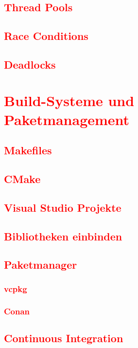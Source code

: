 \section{\textcolor{red}{Thread Pools}}\label{sec:thread-pools}
\section{\textcolor{red}{Race Conditions}}\label{sec:race-conditions}
\section{\textcolor{red}{Deadlocks}}\label{sec:deadlocks}

\chapter{\textcolor{red}{Build-Systeme und Paketmanagement}}\label{chap:build-systems}
\section{\textcolor{red}{Makefiles}}\label{sec:makefiles}
\section{\textcolor{red}{CMake}}\label{sec:cmake}
\section{\textcolor{red}{Visual Studio Projekte}}\label{sec:vs-projects}
\section{\textcolor{red}{Bibliotheken einbinden}}\label{sec:including-libraries}
\section{\textcolor{red}{Paketmanager}}\label{sec:package-managers}
\subsection{\textcolor{red}{vcpkg}}\label{sec:vcpkg}
\subsection{\textcolor{red}{Conan}}\label{sec:conan}
\section{\textcolor{red}{Continuous Integration}}\label{sec:continuous-integration}

